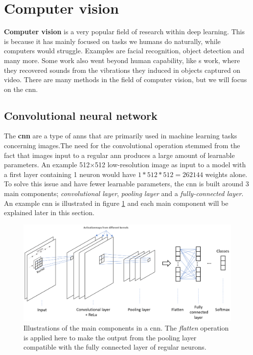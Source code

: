 \section{Computer vision} \label{computer vision}
    \textbf{Computer vision} is a very popular field of research within deep learning\cite{voulodimos2018deep_computer_vision}. This is because it has mainly focused on tasks we humans do naturally, while computers would struggle. Examples are facial recognition, object detection and many more. Some work also went beyond human capability, like \citeauthor{davis2014visual_deep_video_audio}s\cite{davis2014visual_deep_video_audio} work, where they recovered sounds from the vibrations they induced in objects captured on video. There are many methods in the field of computer vision, but we will focus on the \gls{cnn}.
    
    
    
\subsection{Convolutional neural network} \label{cnn}
    The \textbf{\gls{cnn}} are a type of \gls{ann}s that are primarily used in machine learning tasks concerning images\cite{o2015introduction_convolutions}.The need for the convolutional operation stemmed from the fact that images input to a regular \gls{ann} produces a large amount of learnable parameters. An example 512×512 low-resolution image as input to a model with a first layer containing 1 neuron would have $1*512*512 = 262144$ weights alone.  To solve this issue and have fewer learnable parameters, the \gls{cnn} is built around 3 main components\cite{o2015introduction_convolutions}; \textit{convolutional layer}, \textit{pooling layer} and a \textit{fully-connected layer}. An example \gls{cnn} is illustrated in figure \ref{convolutional_neural_network_fig} and each main component will be explained later in this section.

    \begin{figure}[H]
        \centering
        \includegraphics[scale=0.4]{figures/conv_net.png}
        \caption[Convolutional neural network example]{Illustrations of the main components in a \gls{cnn}. The \textit{flatten} operation is applied here to make the output from the pooling layer compatible with the fully connected layer of regular neurons.}
      	\medskip 
        \label{convolutional_neural_network_fig}
    \end{figure}
    

